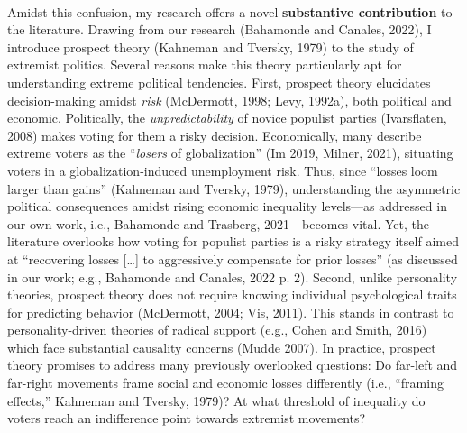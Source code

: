 \documentclass[letterpaper]{article}
\begin{document}
\paragraph{}Amidst this confusion, my research offers a novel {\bf substantive contribution} to the literature. Drawing from our research (Bahamonde and Canales, 2022), I introduce prospect theory (Kahneman and Tversky, 1979) to the study of extremist politics. Several reasons make this theory particularly apt for understanding extreme political tendencies. First, prospect theory elucidates decision-making amidst \emph{risk} (McDermott, 1998; Levy, 1992a), both political and economic. Politically, the \emph{unpredictability} of novice populist parties (Ivarsflaten, 2008) makes voting for them a risky decision. Economically, many describe extreme voters as the ``\emph{losers} of globalization'' (Im 2019, Milner, 2021), situating voters in a globalization-induced unemployment risk.  Thus, since ``losses loom larger than gains'' (Kahneman and Tversky, 1979), understanding the asymmetric political consequences amidst rising economic inequality levels---as addressed in our own work, i.e., Bahamonde and Trasberg, 2021---becomes vital. Yet, the literature overlooks how voting for populist parties is a risky strategy itself aimed at ``recovering losses […] to aggressively compensate for prior losses'' (as discussed in our work; e.g., Bahamonde and Canales, 2022 p. 2). Second, unlike personality theories, prospect theory does not require knowing individual psychological traits for predicting behavior (McDermott, 2004; Vis, 2011). This stands in contrast to personality-driven theories of radical support (e.g., Cohen and Smith, 2016) which face substantial causality concerns (Mudde 2007). In practice, prospect theory promises to address many previously overlooked questions: Do far-left and far-right movements frame social and economic losses differently (i.e., ``framing effects,'' Kahneman and Tversky, 1979)? At what threshold of inequality do voters reach an indifference point towards extremist movements?
\end{document}
